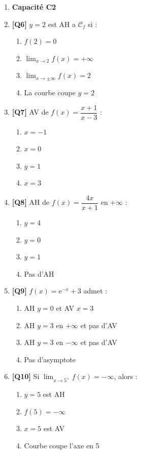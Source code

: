 \begin{enumerate}
\item[] \textbf{Capacité C2}

\item \textbf{[Q6]} $y = 2$ est AH a $\mathcal{C}_f$ si :
  \begin{enumerate}[label=\Alph*.]
    \item $f(2) = 0$
    \item $\lim_{x \to 2} f(x) = +\infty$
    \item $\lim_{x \to \pm\infty} f(x) = 2$
    \item La courbe coupe $y = 2$
  \end{enumerate}

\item \textbf{[Q7]} AV de $f(x) = \dfrac{x+1}{x-3}$ :
  \begin{enumerate}[label=\Alph*.]
    \item $x = -1$
    \item $x = 0$
    \item $y = 1$
    \item $x = 3$
  \end{enumerate}

\item \textbf{[Q8]} AH de $f(x) = \dfrac{4x}{x+1}$ en $+\infty$ :
  \begin{enumerate}[label=\Alph*.]
    \item $y = 4$
    \item $y = 0$
    \item $y = 1$
    \item Pas d'AH
  \end{enumerate}

\item \textbf{[Q9]} $f(x) = \mathrm{e}^{-x} + 3$ admet :
  \begin{enumerate}[label=\Alph*.]
    \item AH $y=0$ et AV $x=3$
    \item AH $y=3$ en $+\infty$ et pas d'AV
    \item AH $y=3$ en $-\infty$ et pas d'AV
    \item Pas d'asymptote
  \end{enumerate}

\item \textbf{[Q10]} Si $\lim_{x \to 5^+} f(x) = -\infty$, alors :
  \begin{enumerate}[label=\Alph*.]
    \item $y=5$ est AH
    \item $f(5) = -\infty$
    \item $x=5$ est AV
    \item Courbe coupe l'axe en 5
  \end{enumerate}


\end{enumerate}
